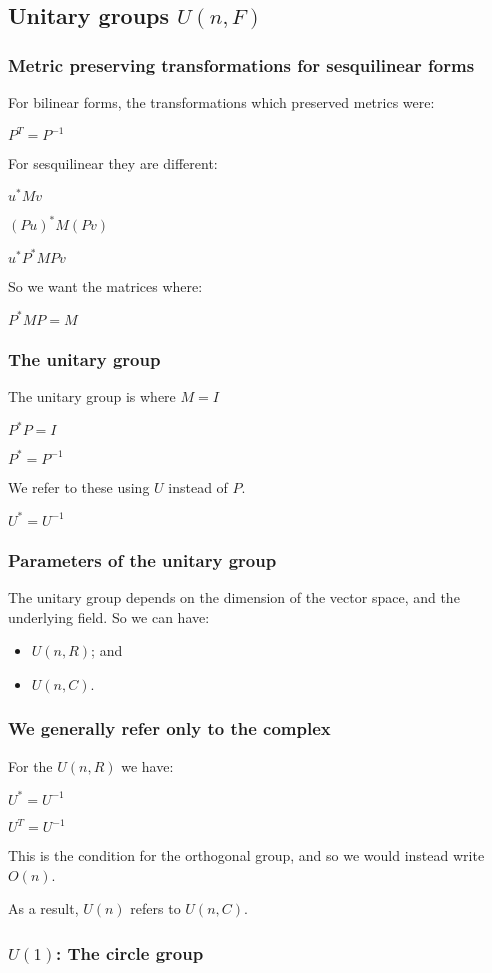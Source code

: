 \subsection{Unitary groups \(U(n, F)\)}

\subsubsection{Metric preserving transformations for sesquilinear forms}

For bilinear forms, the transformations which preserved metrics were:

\(P^T=P^{-1}\)

For sesquilinear they are different:

\(u^*Mv\)

\((Pu)^*M(Pv)\)

\(u^*P^*MPv\)

So we want the matrices where:

\(P^*MP=M\)

\subsubsection{The unitary group}

The unitary group is where \(M=I\)

\(P^*P=I\)

\(P^*=P^{-1}\)

We refer to these using \(U\) instead of \(P\).

\(U^*=U^{-1}\)

\subsubsection{Parameters of the unitary group}

The unitary group depends on the dimension of the vector space, and the underlying field. So we can have:

\begin{itemize}
\item \(U(n, R)\); and
\item \(U(n, C)\).
\end{itemize}

\subsubsection{We generally refer only to the complex}

For the \(U(n, R)\) we have:

\(U^*=U^{-1}\)

\(U^T=U^{-1}\)

This is the condition for the orthogonal group, and so we would instead write \(O(n)\).

As a result, \(U(n)\) refers to \(U(n,C)\).
\subsubsection{\(U(1)\): The circle group}

